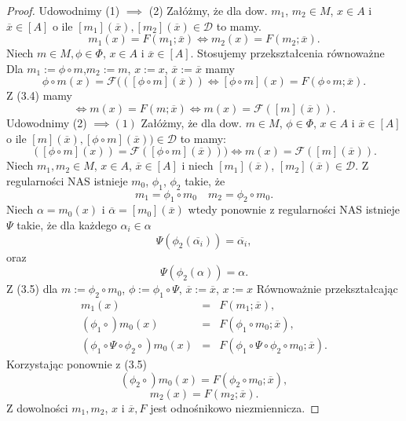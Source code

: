 \documentclass[12pt,a4paper]{report}
\newcommand{\domkniecie}[1]{\left[ {#1} \right] }
\begin{document}
\begin{proof}
Udowodnimy (1) $\implies$ (2)
Załóżmy, że dla dow. $m_{1}$, $ m_{2} \in M$, $x \in A$ i $\overline{x} \in \domkniecie{A}$ o ile $\domkniecie{m_1}(\overline{x}), \domkniecie{m_2}(\overline{x})\in \mathcal{D}$ to mamy.
\begin{equation}
 m_{1}(x)=F(m_{1};\overline{x}) \iff m_{2}(x)=F(m_{2};\overline{x}).
\end{equation}
Niech $m\in M, \phi \in \Phi$, $x \in A$ i $\overline{x}\in \domkniecie{A}$.
Stosujemy przekształcenia równoważne
Dla $m_1:=\phi\circ m$,$ m_2:=m$, $x:=x$, $\overline{x}:=\overline{x}$ mamy
$$
\phi\circ m(x)=\mathcal{F}((\domkniecie{\phi \circ m}(\overline{x})) \iff \domkniecie{\phi \circ m}(x)=F(\phi \circ m;\overline{x}). 
$$
Z (3.4) mamy
$$
\iff m(x)=F(m;\overline{x}) \iff m(x)=\mathcal{F}(\domkniecie{m}(\overline{x})).
$$
Udowodnimy (2) $\implies (1)$
Załóżmy, że dla dow. $m \in M$, $\phi \in \Phi$, $ x \in A$ i $\overline{x} \in \domkniecie{A}$ o ile $\domkniecie{m}(\overline{x}), \domkniecie{\phi\circ m}(\overline{x})) \in \mathcal{D}$ to mamy:
\begin{equation}
(\domkniecie{\phi\circ m}(x))=\mathcal{F}( \domkniecie{\phi \circ m}(\overline{x}))) \iff m(x)=\mathcal{F}(\domkniecie{m}(\overline{x})).
\end{equation}
Niech $m_1,m_2 \in M$, $x \in A$, $\overline{x}\in \domkniecie{A}$ i niech $\domkniecie{m_1}(\overline{x})$, $\domkniecie{m_2}(\overline{x})\in \mathcal{D}$. Z regularności NAS istnieje $m_0$, $\phi_1$, $\phi_2$ takie, że
$$ 
m_1=\phi_1\circ m_0 \quad m_2=\phi_2\circ m_0.
$$
Niech $\alpha=m_0(x)$ i $\overline{\alpha}=\domkniecie{m_0}(\overline{x})$ wtedy ponownie z regularności NAS istnieje $\Psi$ takie, że dla każdego $\alpha_i \in \alpha$
$$
\Psi(\phi_2(\overline{\alpha_i}))=\overline{\alpha_i},
$$
oraz
$$
\Psi(\phi_2(\alpha))=\alpha.
$$
Z (3.5) dla $m:=\phi_2 \circ m_0$, $\phi:=\phi_1\circ \Psi$, $\overline{x}:=\overline{x}$, $x:=x$
Równoważnie przekształcając
\begin{eqnarray*}
m_1(x) & = & F(m_1;\overline{x}), \\
 (\phi_1\circ) m_0(x) & = & F(\phi_1 \circ m_0;\overline{x}),\\
(\phi_1\circ\Psi\circ\phi_2\circ)m_0(x)&=&F(\phi_1\circ\Psi\circ\phi_2\circ m_0;\overline{x}). 
\end{eqnarray*}
Korzystając ponownie z (3.5)
$$
(\phi_2\circ )m_0(x)=F(\phi_2\circ m_0;\overline{x}), 
$$
$$
m_2(x)=F(m_2;\overline{x}).
$$
Z dowolności $m_1, m_2$, $x$ i $\overline{x}, F$ jest odnośnikowo niezmiennicza.


\end{proof}
\end{document}
